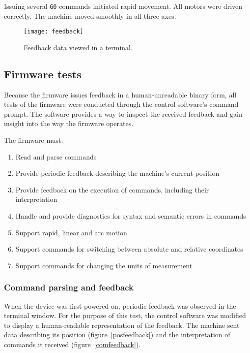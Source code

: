 Issuing several \texttt{G0} commands initiated rapid movement. All motors were
driven correctly. The machine moved smoothly in all three axes.

\begin{figure}[ht]
    \begin{center}
        \texttt{[image: feedback]}
        \caption{Feedback data viewed in a terminal.}
        \label{feedback}
    \end{center}
\end{figure}

\subsection{Firmware tests}

Because the firmware issues feedback in a human-unreadable binary form, all
tests of the firmware were conducted through the control software's command
prompt. The software provides a way to inspect the received feedback and gain
insight into the way the firmware operates.

The firmware must:
\begin{enumerate}
    \item Read and parse commands
    \item Provide periodic feedback describing the machine's current position
    \item Provide feedback on the execution of commands, including their
    interpretation
    \item Handle and provide diagnostics for syntax and semantic errors in
    commands
    \item Support rapid, linear and arc motion
    \item Support commands for switching between absolute and relative
    coordinates
    \item Support commands for changing the units of measurement
\end{enumerate}

\subsubsection{Command parsing and feedback}

When the device was first powered on, periodic feedback was observed in the
terminal window. For the purpose of this test, the control software was modified
to display a human-readable representation of the feedback. The machine sent
data describing its position (figure~\ref{posfeedback}) and the interpretation
of commands it received (figure~\ref{comfeedback}).

